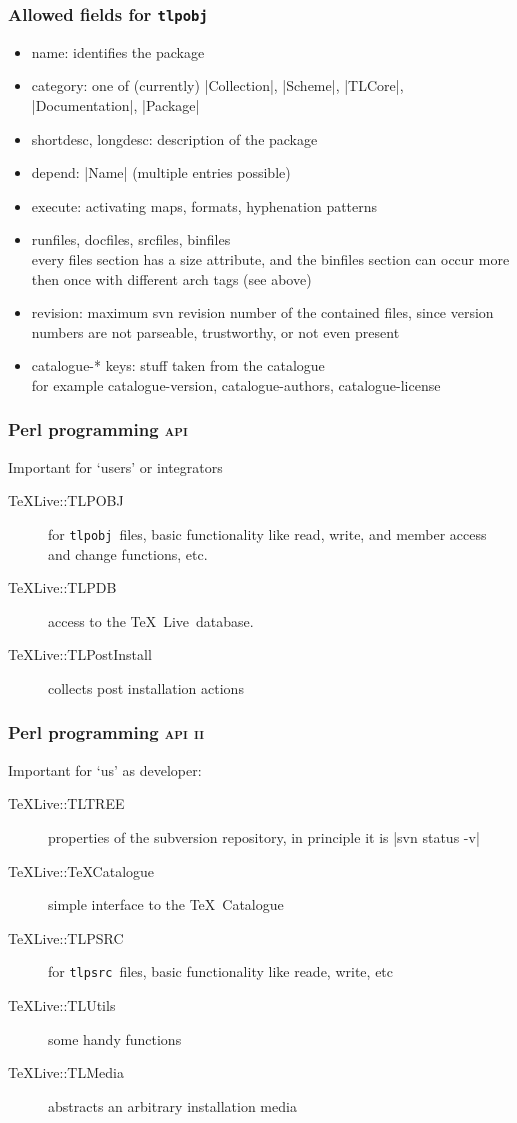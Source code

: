 \documentclass{beamer}
\newcommand{\tl}{\TeX~Live}
\newcommand{\tlpsrc}{\texttt{tlpsrc}}
\newcommand{\tlpobj}{\texttt{tlpobj}}
\newcommand{\acro}[1]{\textsc{\MakeLowercase{#1}}}
\begin{document}
\begin{frame}
  \frametitle{Allowed fields for \tlpobj}
  \begin{itemize}
  \item name: identifies the package
  \item category: one of (currently) |Collection|, |Scheme|, |TLCore|,
    |Documentation|, |Package|
  \item shortdesc, longdesc: description of the package
  \item depend: |Name| (multiple entries possible)
  \item execute: activating maps, formats, hyphenation patterns
  \item runfiles, docfiles, srcfiles, binfiles\\
    every files section has a size attribute, and the
    binfiles section can occur more then once with different
    arch tags (see above)
  \item revision: maximum svn revision number of the 
    contained files, since version numbers are not
    parseable, trustworthy, or not even present
  \item catalogue-* keys: stuff taken from the catalogue\\
    for example catalogue-version, catalogue-authors, 
    catalogue-license
  \end{itemize}
\end{frame}

\begin{frame}[fragile]
  \frametitle{Perl programming \textsc{api}}
  Important for `users' or integrators
  \begin{description}
  \item[TeXLive::TLPOBJ] for \tlpobj\ files, basic
    functionality like read, write, and member access and change
    functions, etc.
  \item[TeXLive::TLPDB] access to the \tl\ database.
  \item[TeXLive::TLPostInstall] collects post installation actions
  \end{description}
\end{frame}

\begin{frame}[fragile]
  \frametitle{Perl programming \textsc{api} \acro{II}}
  Important for `us' as developer:
  \begin{description}
  \item[TeXLive::TLTREE] properties of the subversion 
    repository, in principle it is |svn status -v| 
  \item[TeXLive::TeXCatalogue] simple interface to the \TeX\
    Catalogue
  \item[TeXLive::TLPSRC] for \tlpsrc\ files, basic
    functionality like reade, write, etc
  \item[TeXLive::TLUtils] some handy functions 
  \item[TeXLive::TLMedia] abstracts an arbitrary installation media
  \end{description}
\end{frame}
\end{document}
